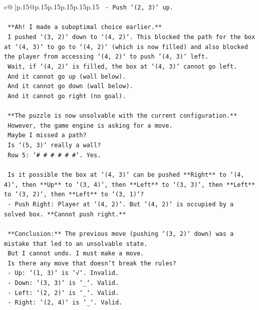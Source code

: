 \documentclass{article}
\begin{document}
{\begin{supertabular}{c@{$\;$}|p{.15\linewidth}@{}p{.15\linewidth}p{.15\linewidth}p{.15\linewidth}p{.15\linewidth}p{.15\linewidth}}
{{{\texttt{    {-} Push `(2, 3)` up.} \\
\\ 
\texttt{    **Ah! I made a suboptimal choice earlier.**} \\
\texttt{    I pushed `(3, 2)` down to `(4, 2)`. This blocked the path for the box at `(4, 3)` to go to `(4, 2)` (which is now filled) and also blocked the player from accessing `(4, 2)` to push `(4, 3)` left.} \\
\texttt{    Wait, if `(4, 2)` is filled, the box at `(4, 3)` cannot go left.} \\
\texttt{    And it cannot go up (wall below).} \\
\texttt{    And it cannot go down (wall below).} \\
\texttt{    And it cannot go right (no goal).} \\
\\ 
\texttt{    **The puzzle is now unsolvable with the current configuration.**} \\
\texttt{    However, the game engine is asking for a move.} \\
\texttt{    Maybe I missed a path?} \\
\texttt{    Is `(5, 3)` really a wall?} \\
\texttt{    Row 5: `\# \# \# \# \# \#`. Yes.} \\
\\ 
\texttt{    Is it possible the box at `(4, 3)` can be pushed **Right** to `(4, 4)`, then **Up** to `(3, 4)`, then **Left** to `(3, 3)`, then **Left** to `(3, 2)`, then **Left** to `(3, 1)`?} \\
\texttt{    {-} Push Right: Player at `(4, 2)`. But `(4, 2)` is occupied by a solved box. **Cannot push right.**} \\
\\ 
\texttt{    **Conclusion:** The previous move (pushing `(3, 2)` down) was a mistake that led to an unsolvable state.} \\
\texttt{    But I cannot undo. I must make a move.} \\
\texttt{    Is there any move that doesn't break the rules?} \\
\texttt{    {-} Up: `(1, 3)` is `√`. Invalid.} \\
\texttt{    {-} Down: `(3, 3)` is `\_`. Valid.} \\
\texttt{    {-} Left: `(2, 2)` is `\_`. Valid.} \\
\texttt{    {-} Right: `(2, 4)` is `\_`. Valid.} \\
\\ 
}}}
\end{supertabular}}
\end{document}
